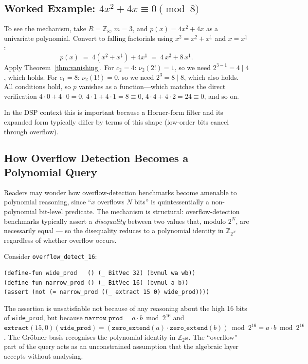 \documentclass[runningheads]{llncs}
\begin{document}
\subsection{Worked Example: $4x^2 + 4x \equiv 0 \pmod{8}$}
\label{sec:vanishing-example}

To see the mechanism, take $R = \mathbb{Z}_8$, $m = 3$, and
$p(x) = 4x^2 + 4x$ as a univariate polynomial.
Convert to falling factorials using $x^2 = x^{\underline{2}} + x^{\underline{1}}$
and $x = x^{\underline{1}}$:
\[
  p(x) \;=\; 4(x^{\underline{2}} + x^{\underline{1}}) + 4 x^{\underline{1}}
        \;=\; 4 \, x^{\underline{2}} + 8 \, x^{\underline{1}}.
\]
Apply Theorem~\ref{thm:vanishing}. For $c_2 = 4$: $\nu_2(2!) = 1$,
so we need $2^{3-1} = 4 \mid 4$, which holds. For $c_1 = 8$:
$\nu_2(1!) = 0$, so we need $2^3 = 8 \mid 8$, which also holds.
All conditions hold, so $p$ vanishes as a function---which matches
the direct verification $4 \cdot 0 + 4 \cdot 0 = 0$, $4 \cdot 1 + 4 \cdot 1 = 8 \equiv 0$,
$4 \cdot 4 + 4 \cdot 2 = 24 \equiv 0$, and so on.

In the DSP context this is important because a Horner-form filter
and its expanded form typically differ by terms of this shape
(low-order bits cancel through overflow).

\subsection{How Overflow Detection Becomes a Polynomial Query}
\label{sec:overflow-encoding}

Readers may wonder how overflow-detection benchmarks become amenable
to polynomial reasoning, since ``$x$ overflows $N$ bits'' is
quintessentially a non-polynomial bit-level predicate. The mechanism
is structural: overflow-detection benchmarks typically assert a
\emph{disequality} between two values that, modulo $2^N$, are
necessarily equal --- so the disequality reduces to a polynomial
identity in $\mathbb{Z}_{2^N}$ regardless of whether overflow occurs.

Consider \texttt{overflow\_detect\_16}:
\begin{verbatim}
(define-fun wide_prod   () (_ BitVec 32) (bvmul wa wb))
(define-fun narrow_prod () (_ BitVec 16) (bvmul a b))
(assert (not (= narrow_prod ((_ extract 15 0) wide_prod))))
\end{verbatim}
The assertion is unsatisfiable not because of any reasoning about
the high 16 bits of \texttt{wide\_prod}, but because
$\texttt{narrow\_prod} = a\cdot b \bmod 2^{16}$ and
$\texttt{extract}(15,0)(\texttt{wide\_prod})
= (\texttt{zero\_extend}(a) \cdot \texttt{zero\_extend}(b)) \bmod 2^{16}
= a\cdot b \bmod 2^{16}$. The Gr\"obner basis recognises the polynomial
identity in $\mathbb{Z}_{2^{16}}$. The ``overflow'' part of the query
acts as an unconstrained assumption that the algebraic layer accepts
without analysing.
\end{document}
